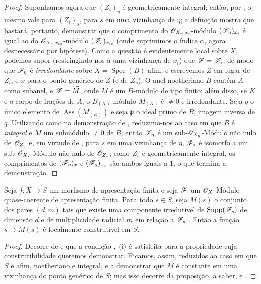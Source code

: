 \begin{proof}
Suponhamos agora que $(Z_i)_\eta$ é geometricamente integral; então, por , o mesmo vale para $(Z_i)_s$, para $s$ em uma vizinhança de $\eta$; a definição  mostra que bastará, portanto, demonstrar que o comprimento do $\mathscr{O}_{X_\eta,x_i}$-módulo $(\mathscr{F}_\eta)_{x_i}$ é igual ao do $\mathscr{O}_{X_s,x_{is}}$-módulo $(\mathscr{F}_s)_{x_{is}}$ (onde suprimimos o índice $\alpha$, agora desnecessário por hipótese).
Como a questão é evidentemente local sobre $X$, podemos supor (restringindo-nos a uma vizinhança de $x_i$) que $\mathscr{F}=\mathscr{F}_i$, de modo que $\mathscr{F}_\eta$ é \emph{irredondante} sobre $X=\operatorname{Spec}(B)$ afim, e escrevemos $Z$ em lugar de $Z_i$, e $x$ para o ponto genérico de $Z$ (e de $Z_\eta$).
O anel noetheriano $B$ contém $A$ como subanel, e $\mathscr{F}=\widetilde{M}$, onde $M$ é um $B$-módulo de tipo finito; além disso, se $K$ é o corpo de frações de $A$, o $B_{(K)}$-módulo $M_{(K)}$ é $\neq 0$ e irredondante.
Seja $q$ o único elemento de $\operatorname{Ass}(M_{(K)})$ e seja $\mathfrak{p}$ o ideal primo de $B$, imagem inversa de $q$.
Utilizando  como na demonstração de , reduzimo-nos ao caso em que $B$ é \emph{integral} e $M$ um submódulo $\neq 0$ de $B$; então $\mathscr{F}_\eta$ é um sub-$\mathscr{O}_{X_\eta}$-Módulo não nulo de $\mathscr{O}_{Z_\eta}$ e, em virtude de , para $s$ em uma vizinhança de $\eta$, $\mathscr{F}_s$ é isomorfo a um sub-$\mathscr{O}_{X_s}$-Módulo não nulo de $\mathscr{O}_{Z_s}$; como $Z_s$ é geometricamente integral, os comprimentos de $(\mathscr{F}_\eta)_x$ e $(\mathscr{F}_s)_{x_s}$ são ambos iguais a $1$, o que termina a demonstração.
\end{proof}

\begin{corollary}[9.8.7]
\label{IV.9.8.7}
Seja $f:X\to S$ um morfismo de apresentação finita e seja $\mathscr{F}$ um $\mathscr{O}_X$-Módulo quase-coerente de apresentação finita.
Para todo $s\in S$, seja $M(s)$ o conjunto dos pares $(d,m)$ tais que existe uma componente irredutível de $\operatorname{Supp}(\mathscr{F}_s)$ de dimensão $d$ e de multiplicidade radicial $m$ em relação a $\mathscr{F}_s$ .
Então a função $s\mapsto M(s)$ é localmente construtível em $S$.
\end{corollary}

\begin{proof}
\label{IV.9.8.7-proof}
Decorre de  e  que a condição ,~(i) é satisfeita para a propriedade cuja construtibilidade queremos demonstrar.
Ficamos, assim, reduzidos ao caso em que $S$ é afim, noetheriano e integral, e a demonstrar que $M$ é constante em uma vizinhança do ponto genérico de $S$; mas isso decorre da proposição, a saber,  e .
\end{proof}

